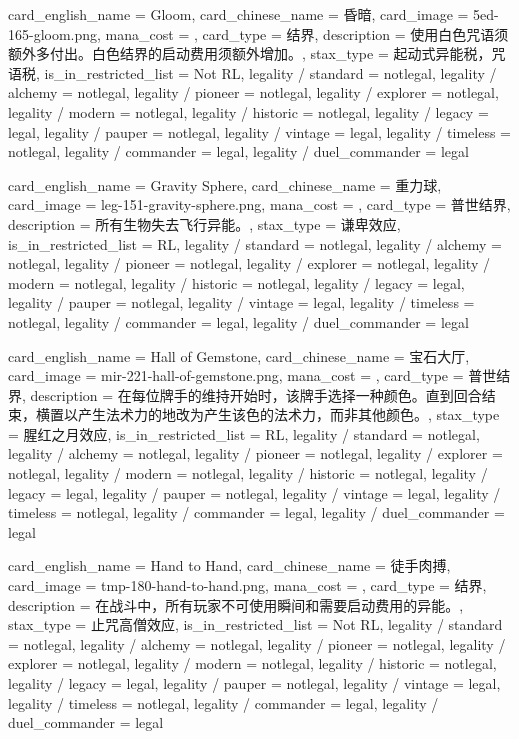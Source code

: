 \documentclass[lang = cn, color = black, 10pt]{AllThatStax}
\begin{document}
\card
{
	card_english_name = {Gloom},
	card_chinese_name = {昏暗},
	card_image = 5ed-165-gloom.png,
	mana_cost = ,
	card_type = 结界,
	description = {使用白色咒语须额外多付出。白色结界的启动费用须额外增加。},
	stax_type = 起动式异能税，咒语税,
	is_in_restricted_list = Not RL,
	legality / standard = notlegal,
	legality / alchemy = notlegal,
	legality / pioneer = notlegal,
	legality / explorer = notlegal,
	legality / modern = notlegal,
	legality / historic = notlegal,
	legality / legacy = legal,
	legality / pauper = notlegal,
	legality / vintage = legal,
	legality / timeless = notlegal,
	legality / commander = legal,
	legality / duel_commander = legal
}

\card
{
	card_english_name = {Gravity Sphere},
	card_chinese_name = {重力球},
	card_image = leg-151-gravity-sphere.png,
	mana_cost = ,
	card_type = 普世结界,
	description = {所有生物失去飞行异能。},
	stax_type = 谦卑效应,
	is_in_restricted_list = RL,
	legality / standard = notlegal,
	legality / alchemy = notlegal,
	legality / pioneer = notlegal,
	legality / explorer = notlegal,
	legality / modern = notlegal,
	legality / historic = notlegal,
	legality / legacy = legal,
	legality / pauper = notlegal,
	legality / vintage = legal,
	legality / timeless = notlegal,
	legality / commander = legal,
	legality / duel_commander = legal
}

\card
{
	card_english_name = {Hall of Gemstone},
	card_chinese_name = {宝石大厅},
	card_image = mir-221-hall-of-gemstone.png,
	mana_cost = ,
	card_type = 普世结界,
	description = {在每位牌手的维持开始时，该牌手选择一种颜色。直到回合结束，横置以产生法术力的地改为产生该色的法术力，而非其他颜色。},
	stax_type = 腥红之月效应,
	is_in_restricted_list = RL,
	legality / standard = notlegal,
	legality / alchemy = notlegal,
	legality / pioneer = notlegal,
	legality / explorer = notlegal,
	legality / modern = notlegal,
	legality / historic = notlegal,
	legality / legacy = legal,
	legality / pauper = notlegal,
	legality / vintage = legal,
	legality / timeless = notlegal,
	legality / commander = legal,
	legality / duel_commander = legal
}

\card
{
	card_english_name = {Hand to Hand},
	card_chinese_name = {徒手肉搏},
	card_image = tmp-180-hand-to-hand.png,
	mana_cost = ,
	card_type = 结界,
	description = {在战斗中，所有玩家不可使用瞬间和需要启动费用的异能。},
	stax_type = 止咒高僧效应,
	is_in_restricted_list = Not RL,
	legality / standard = notlegal,
	legality / alchemy = notlegal,
	legality / pioneer = notlegal,
	legality / explorer = notlegal,
	legality / modern = notlegal,
	legality / historic = notlegal,
	legality / legacy = legal,
	legality / pauper = notlegal,
	legality / vintage = legal,
	legality / timeless = notlegal,
	legality / commander = legal,
	legality / duel_commander = legal
}
\end{document}
